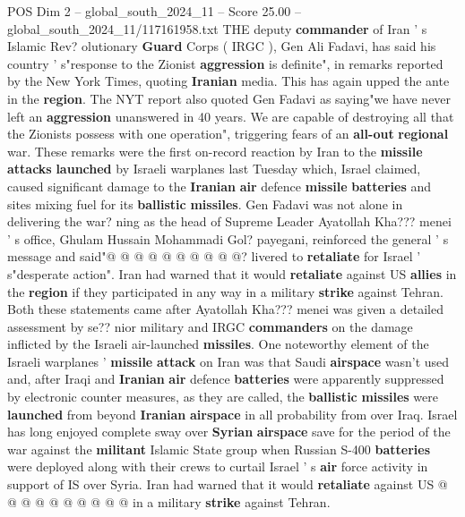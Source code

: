 \begin{textsample}{POS Dim 2 – global\_south\_2024\_11 – Score 25.00 – global\_south\_2024\_11/117161958.txt}  \label{ex:f2_pos_171}
THE deputy \textbf{commander} of Iran ' s Islamic Rev? olutionary \textbf{Guard} Corps ( IRGC ), Gen Ali Fadavi, has said his country ' s"response to the Zionist \textbf{aggression} is definite", in remarks reported by the New York Times, quoting \textbf{Iranian} media.
This has again upped the ante in the \textbf{region}.
The NYT report also quoted Gen Fadavi as saying"we have never left an \textbf{aggression} unanswered in 40 years.
We are capable of destroying all that the Zionists possess with one operation", triggering fears of an \textbf{all-out} \textbf{regional} war.
These remarks were the first on-record reaction by Iran to the \textbf{missile} \textbf{attacks} \textbf{launched} by Israeli warplanes last Tuesday which, Israel claimed, caused significant damage to the \textbf{Iranian} \textbf{air} defence \textbf{missile} \textbf{batteries} and sites mixing fuel for its \textbf{ballistic} \textbf{missiles}.
Gen Fadavi was not alone in delivering the war? ning as the head of Supreme Leader Ayatollah Kha??? menei ' s office, Ghulam Hussain Mohammadi Gol? payegani, reinforced the general ' s message and said"@ @ @ @ @ @ @ @ @ @? livered to \textbf{retaliate} for Israel ' s"desperate action".
Iran had warned that it would \textbf{retaliate} against US \textbf{allies} in the \textbf{region} if they participated in any way in a military \textbf{strike} against Tehran.
Both these statements came after Ayatollah Kha??? menei was given a detailed assessment by se?? nior military and IRGC \textbf{commanders} on the damage inflicted by the Israeli air-launched \textbf{missiles}.
One noteworthy element of the Israeli warplanes ' \textbf{missile} \textbf{attack} on Iran was that Saudi \textbf{airspace} wasn't used and, after Iraqi and \textbf{Iranian} \textbf{air} defence \textbf{batteries} were apparently suppressed by electronic counter measures, as they are called, the \textbf{ballistic} \textbf{missiles} were \textbf{launched} from beyond \textbf{Iranian} \textbf{airspace} in all probability from over Iraq.
Israel has long enjoyed complete sway over \textbf{Syrian} \textbf{airspace} save for the period of the war against the \textbf{militant} Islamic State group when Russian S-400 \textbf{batteries} were deployed along with their crews to curtail Israel ' s \textbf{air} force activity in support of IS over Syria.
Iran had warned that it would \textbf{retaliate} against US @ @ @ @ @ @ @ @ @ @ in a military \textbf{strike} against Tehran.

\end{textsample}
